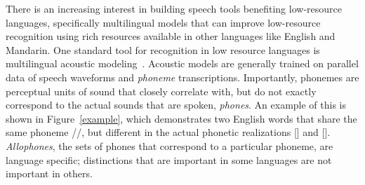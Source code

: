 \documentclass{article}
\newcommand{\gn}[1]{\textcolor{magenta}{\small [#1 --GN]}}
\newcommand{\drm}[1]{\textcolor{orange}{\small [#1 ---DRM]}}
\begin{document}
There is an increasing interest in building speech tools benefiting low-resource languages, specifically multilingual models that can improve low-resource recognition using rich resources available in other languages like English and Mandarin. One standard tool for recognition in low resource languages is multilingual acoustic modeling~\cite{dalmia2018sequence}. %
Acoustic models are generally trained on parallel data of speech waveforms and \emph{phoneme} transcriptions.
Importantly, phonemes are perceptual units of sound that closely correlate with, but do not exactly correspond to the actual sounds that are spoken, \emph{phones}.
An example of this is shown in Figure~\ref{example}, which demonstrates two English words that share the same phoneme //, but different in the actual phonetic realizations [] and [].
\emph{Allophones}, the sets of phones that correspond to a particular phoneme, are language specific; distinctions that are important in some languages are not important in others.
\end{document}
